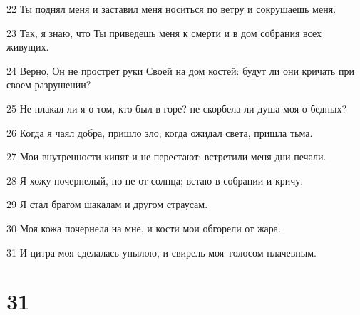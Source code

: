 \par 22 Ты поднял меня и заставил меня носиться по ветру и сокрушаешь меня.
\par 23 Так, я знаю, что Ты приведешь меня к смерти и в дом собрания всех живущих.
\par 24 Верно, Он не прострет руки Своей на дом костей: будут ли они кричать при своем разрушении?
\par 25 Не плакал ли я о том, кто был в горе? не скорбела ли душа моя о бедных?
\par 26 Когда я чаял добра, пришло зло; когда ожидал света, пришла тьма.
\par 27 Мои внутренности кипят и не перестают; встретили меня дни печали.
\par 28 Я хожу почернелый, но не от солнца; встаю в собрании и кричу.
\par 29 Я стал братом шакалам и другом страусам.
\par 30 Моя кожа почернела на мне, и кости мои обгорели от жара.
\par 31 И цитра моя сделалась унылою, и свирель моя--голосом плачевным.

\chapter{31}

